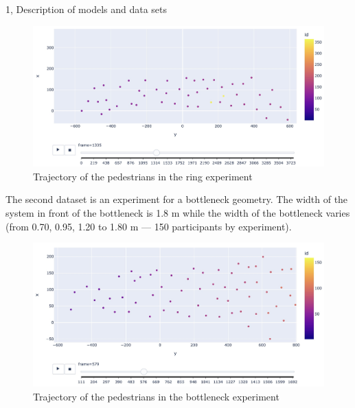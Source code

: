 \documentclass[10pt,a4paper]{article}
\begin{document}
\begin{task}{1, Description of models and data sets}
\begin{figure} [H]
    \centering
    \includegraphics[width=15cm]{images/corridor.jpg}
    \caption{Trajectory of the pedestrians in the ring experiment}
    \label{corridor}
\end{figure}

\newpage

The second dataset is an experiment for a bottleneck geometry. The width of the system in front of the bottleneck is 1.8 m while the width of the bottleneck varies (from 0.70, 0.95, 1.20 to 1.80 m — 150 participants by experiment).

\begin{figure} [H]
    \centering
    \includegraphics[width=15cm]{images/bottleneck.jpg}
    \caption{Trajectory of the pedestrians in the bottleneck experiment}
    \label{bottleneck}
\end{figure}

\end{task}

\newpage
\end{document}
